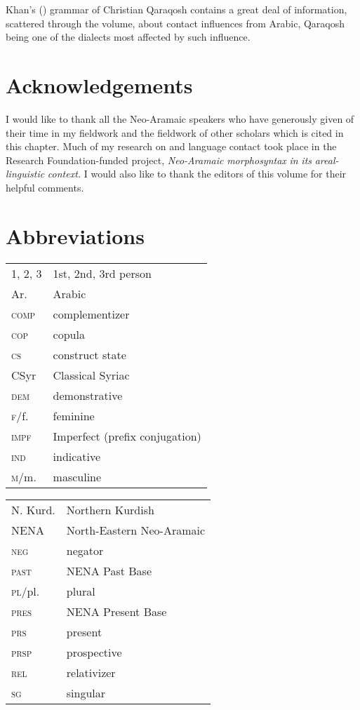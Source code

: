 \documentclass[output=paper]{langsci/langscibook}
\begin{document}
Khan's (\citeyear{Khan2002}) grammar of Christian Qaraqosh contains a great deal of information, scattered through the volume, about contact influences from Arabic, Qaraqosh being one of the dialects most affected by such influence.

\section*{Acknowledgements}

I would like to thank all the Neo-Aramaic speakers who have generously given of their time in my fieldwork and the fieldwork of other scholars which is cited in this chapter. Much of my research on  and language contact took place in the  Research Foundation-funded project, \textit{Neo-Aramaic} \textit{morphosyntax} \textit{in} \textit{its} \textit{areal-linguistic} \textit{context.} I would also like to thank the editors of this volume for their helpful comments.


\section*{Abbreviations}

\begin{tabularx}{.5\textwidth}[t]{@{}lQ@{}}
\textsc{1, 2, 3} & 1st, 2nd, 3rd person \\
Ar.            & Arabic\\
\textsc{comp}    & {complementizer}\\
\textsc{cop}     & {copula}\\
\textsc{cs}     & construct state\\
CSyr          & Classical Syriac\\
\textsc{dem}     & demonstrative \\
\textsc{f}/f.    & feminine\\
\textsc{impf}   & Imperfect (prefix conjugation)\\
\textsc{ind}     & indicative\\
\textsc{m}/m.    & masculine\\
\end{tabularx}%
\begin{tabularx}{.5\textwidth}[t]{@{}lQ@{}}
N. Kurd.        & Northern Kurdish \\ 
NENA            & North-Eastern Neo-Aramaic\\
\textsc{neg}    & negator\\
\textsc{past}   & {NENA} Past Base\\
\textsc{pl}/pl.  & plural\\
\textsc{pres}    & {NENA} Present Base \\
\textsc{prs}    & present \\
\textsc{prsp}    & {prospective} \\
\textsc{rel}     & {relativizer}\\
\textsc{sg}  & singular
\end{tabularx}%
\end{document}
